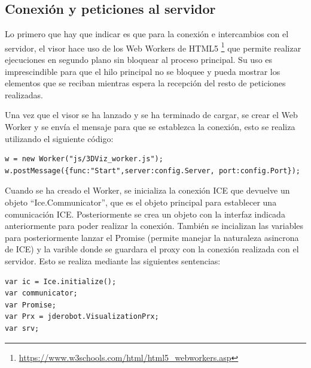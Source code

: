 \subsection{Conexión y peticiones al servidor}
Lo primero que hay que indicar es que para la conexión e intercambios con el servidor, el visor hace uso de los Web Workers de HTML5 \footnote{\url{https://www.w3schools.com/html/html5_webworkers.asp}} que permite realizar ejecuciones en segundo plano sin bloquear al proceso principal. Su uso es imprescindible para que el hilo principal no se bloquee y pueda mostrar los elementos que se reciban mientras espera la recepción del resto de peticiones realizadas.

Una vez que el visor se ha lanzado y se ha terminado de cargar, se crear el Web Worker y se envía el mensaje para que se establezca la conexión, esto se realiza utilizando el siguiente código:
\begin{lstlisting}[frame=single]
w = new Worker("js/3DViz_worker.js");
w.postMessage({func:"Start",server:config.Server, port:config.Port});
\end{lstlisting}

Cuando se ha creado el Worker, se inicializa la conexión ICE que devuelve un objeto ``Ice.Communicator'', que es el objeto principal para establecer una comunicación ICE. Posteriormente se crea un objeto con la interfaz indicada anteriormente para poder realizar la conexión. También se incializan las variables para posteriormente lanzar el Promise (permite manejar la naturaleza asincrona de ICE) y la varible donde se guardara el proxy con la conexión realizada con el servidor. Esto se realiza mediante las siguientes sentencias:
\begin{lstlisting}[frame=single]
var ic = Ice.initialize();
var communicator;
var Promise;
var Prx = jderobot.VisualizationPrx;
var srv;
\end{lstlisting}

